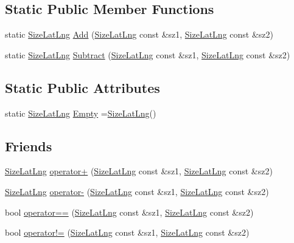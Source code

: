 \subsection*{Static Public Member Functions}
\begin{DoxyCompactItemize}
\item 
static \hyperlink{structinternals_1_1_size_lat_lng}{Size\-Lat\-Lng} \hyperlink{group___o_p_map_widget_gab3c5d8301e62629897221a2d5b2ba0b7}{Add} (\hyperlink{structinternals_1_1_size_lat_lng}{Size\-Lat\-Lng} const \&sz1, \hyperlink{structinternals_1_1_size_lat_lng}{Size\-Lat\-Lng} const \&sz2)
\item 
static \hyperlink{structinternals_1_1_size_lat_lng}{Size\-Lat\-Lng} \hyperlink{group___o_p_map_widget_ga6e437e3b3d5fd023b4afec09ad37928e}{Subtract} (\hyperlink{structinternals_1_1_size_lat_lng}{Size\-Lat\-Lng} const \&sz1, \hyperlink{structinternals_1_1_size_lat_lng}{Size\-Lat\-Lng} const \&sz2)
\end{DoxyCompactItemize}
\subsection*{Static Public Attributes}
\begin{DoxyCompactItemize}
\item 
static \hyperlink{structinternals_1_1_size_lat_lng}{Size\-Lat\-Lng} \hyperlink{group___o_p_map_widget_gad305f7cf650e7a5490bb77ccc65bbe08}{Empty} =\hyperlink{structinternals_1_1_size_lat_lng}{Size\-Lat\-Lng}()
\end{DoxyCompactItemize}
\subsection*{Friends}
\begin{DoxyCompactItemize}
\item 
\hyperlink{structinternals_1_1_size_lat_lng}{Size\-Lat\-Lng} \hyperlink{group___o_p_map_widget_ga398e0bae9b1c31e141e49ea14f960ad3}{operator+} (\hyperlink{structinternals_1_1_size_lat_lng}{Size\-Lat\-Lng} const \&sz1, \hyperlink{structinternals_1_1_size_lat_lng}{Size\-Lat\-Lng} const \&sz2)
\item 
\hyperlink{structinternals_1_1_size_lat_lng}{Size\-Lat\-Lng} \hyperlink{group___o_p_map_widget_ga5d0f63cfc6ce4e2c3249697e3156df5e}{operator-\/} (\hyperlink{structinternals_1_1_size_lat_lng}{Size\-Lat\-Lng} const \&sz1, \hyperlink{structinternals_1_1_size_lat_lng}{Size\-Lat\-Lng} const \&sz2)
\item 
bool \hyperlink{group___o_p_map_widget_gabb95545e93acc311be149febe7752b80}{operator==} (\hyperlink{structinternals_1_1_size_lat_lng}{Size\-Lat\-Lng} const \&sz1, \hyperlink{structinternals_1_1_size_lat_lng}{Size\-Lat\-Lng} const \&sz2)
\item 
bool \hyperlink{group___o_p_map_widget_ga1ee10c15dd9b86cfaf44a95b0bfd5bab}{operator!=} (\hyperlink{structinternals_1_1_size_lat_lng}{Size\-Lat\-Lng} const \&sz1, \hyperlink{structinternals_1_1_size_lat_lng}{Size\-Lat\-Lng} const \&sz2)
\end{DoxyCompactItemize}


